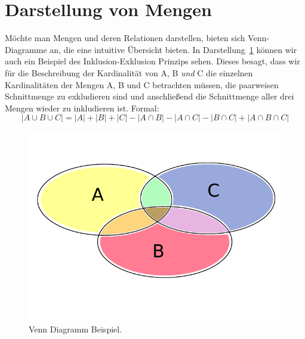 \section{Darstellung von Mengen}
%
Möchte man Mengen und deren Relationen darstellen, bieten sich Venn-Diagramme an,
die eine intuitive Übersicht bieten. In Darstellung~\ref{fig:venn_diagram} können
wir auch ein Beispiel des Inklusion-Exklusion Prinzips sehen. Dieses besagt, dass
wir für die Beschreibung der Kardinalität von A, B \emph{und} C die einzelnen Kardinalitäten
der Mengen A, B und C betrachten müssen, die paarweisen Schnittmenge zu exkludieren
sind und anschließend die Schnittmenge aller drei Mengen wieder zu inkludieren ist.
Formal:
\[
    |A \cup B \cup C| = |A| + |B| + |C| - |A \cap B| - |A \cap C|
        - |B \cap C| + |A \cap B \cap C|
\]
%
\begin{figure}[p]
 \begin{center}
  \includegraphics{img/venn_diagram_example.pdf}
  \caption{Venn Diagramm Beispiel.}
  \label{fig:venn_diagram}
 \end{center}
\end{figure}

